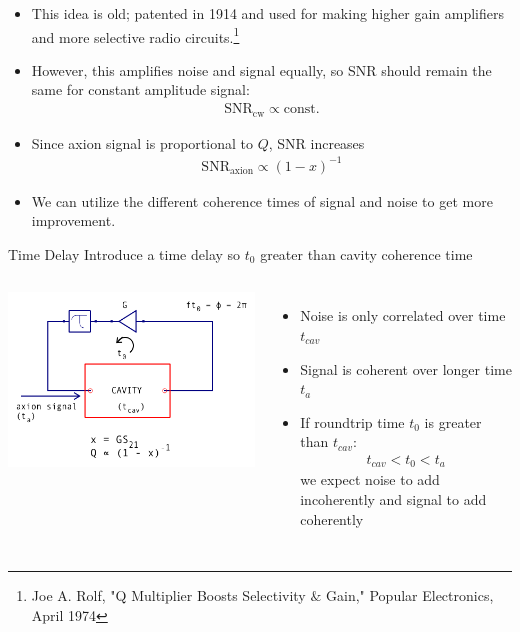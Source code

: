 \documentclass{beamer}
\begin{document}
\begin{frame}
\begin{itemize}
\item This idea is old; patented in 1914 and used for making higher gain amplifiers and more selective radio circuits.\footnote{Joe A. Rolf, "Q Multiplier Boosts Selectivity $\&$ Gain," Popular Electronics, April 1974} 

\item However, this amplifies noise and signal equally, so SNR should remain the same for constant amplitude signal:
\begin{align*}
\text{SNR}_{\text{cw}} \propto \text{const.}
\end{align*}
\item Since axion signal is proportional to $Q$, SNR increases
\begin{align*}
\text{SNR}_{\text{axion}} \propto (1-x)^{-1}
\end{align*}
\item We can utilize the different coherence times of signal and noise to get more improvement.
\end{itemize}
\end{frame}

\begin{frame}{Time Delay}
{\tiny Introduce a time delay so $t_0$ greater than cavity coherence time}
\begin{columns}
\centering
\includegraphics[width=\textwidth]{delay}
\begin{itemize}
\item Noise is only correlated over time $t_{cav}$
\item Signal is coherent over longer time $t_{a}$
\item If roundtrip time $t_0$ is greater than $t_{cav}$:
\begin{align*}
t_{cav} < t_0 < t_a
\end{align*}
we expect noise to add incoherently and signal
to add coherently

\end{itemize}
\end{columns}
\end{frame}
\end{document}
